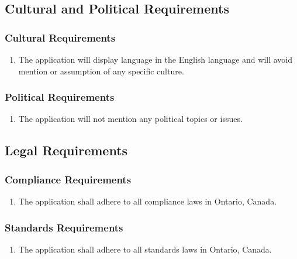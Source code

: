 \documentclass[12pt, titlepage]{article}
\begin{document}

\subsection{Cultural and Political Requirements}
\label{sub:cultural_and_political_requirements}

\subsubsection{Cultural Requirements}
\label{ssub:cultural_requirements}
\begin{enumerate}[{CP}1. ]
	\item The application will display language in the English language and will avoid mention or assumption of any specific culture.
\end{enumerate}

\subsubsection{Political Requirements}
\label{ssub:political_requirements}
\begin{enumerate}[{CP}2. ]
	\item The application will not mention any political topics or issues.
\end{enumerate}


\subsection{Legal Requirements}
\label{sub:legal_requirements}

\subsubsection{Compliance Requirements}
\label{ssub:compliance_requirements}
\begin{enumerate}[{LR}1. ]
	\item The application shall adhere to all compliance laws in Ontario, Canada.
\end{enumerate}

\subsubsection{Standards Requirements}
\label{ssub:standards_requirements}
\begin{enumerate}[{LR}2. ]
	\item The application shall adhere to all standards laws in Ontario, Canada.
\end{enumerate}
\end{document}
